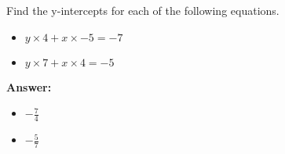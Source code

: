  Find the y-intercepts for each of the following equations. \begin{itemize}\item \( y \times 4 + x \times -5 = -7 \)\item \( y \times 7 + x \times 4 = -5 \)\end{itemize}

        \textbf{Answer:} \begin{itemize}\item \( -\frac{7}{4} \)\item \( -\frac{5}{7} \)\end{itemize}
